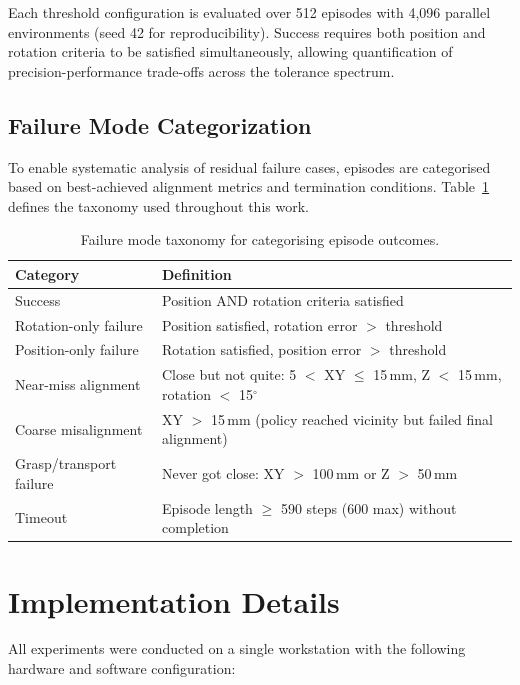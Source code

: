 \documentclass[12pt,a4paper,oneside]{report}
\begin{document}
Each threshold configuration is evaluated over 512 episodes with 4,096 parallel environments (seed 42 for reproducibility). Success requires both position and rotation criteria to be satisfied simultaneously, allowing quantification of precision-performance trade-offs across the tolerance spectrum.

\subsection{Failure Mode Categorization}

To enable systematic analysis of residual failure cases, episodes are categorised based on best-achieved alignment metrics and termination conditions. Table~\ref{tab:failure_taxonomy_method} defines the taxonomy used throughout this work.

\begin{table}[h]
\centering
\small
\begin{tabular}{|l|p{8cm}|}
\hline
\textbf{Category} & \textbf{Definition} \\
\hline
Success & Position AND rotation criteria satisfied \\
\hline
Rotation-only failure & Position satisfied, rotation error $>$ threshold \\
Position-only failure & Rotation satisfied, position error $>$ threshold \\
\hline
Near-miss alignment & Close but not quite: 5 $<$ XY $\leq$ 15\,mm, Z $<$ 15\,mm, rotation $<$ 15$^\circ$ \\
Coarse misalignment & XY $>$ 15\,mm (policy reached vicinity but failed final alignment) \\
\hline
Grasp/transport failure & Never got close: XY $>$ 100\,mm or Z $>$ 50\,mm \\
Timeout & Episode length $\geq$ 590 steps (600 max) without completion \\
\hline
\end{tabular}
\caption{Failure mode taxonomy for categorising episode outcomes.}
\label{tab:failure_taxonomy_method}
\end{table}

\section{Implementation Details}

All experiments were conducted on a single workstation with the following hardware and software configuration:
\end{document}
